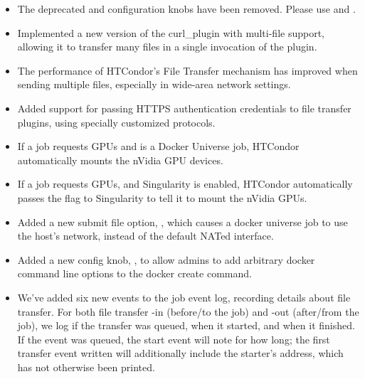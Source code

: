 \begin{itemize}

\item The deprecated  and 
configuration knobs have been removed. Please use 
and .

\item Implemented a new version of the curl\_plugin with multi-file support,
allowing it to transfer many files in a single invocation of the plugin.
 

\item The performance of HTCondor's File Transfer mechanism has improved when
	sending multiple files, especially in wide-area network settings.

\item Added support for passing HTTPS authentication credentials to
file transfer plugins, using specially customized protocols.

\item If a job requests GPUs and is a Docker Universe job, HTCondor
automatically mounts the nVidia GPU devices.

\item If a job requests GPUs, and Singularity is enabled, HTCondor
automatically passes the  flag to Singularity to tell it to mount
the nVidia GPUs.

\item Added a new submit file option, ,
which causes a docker universe job to use the host's network,
instead of the default NATed interface.

\item Added a new config knob, ,
to allow admins to add arbitrary docker command line options to
the docker create command.

\item We've added six new events to the job event log, recording details
about file transfer.  For both file transfer -in (before/to the job) and
-out (after/from the job), we log if the transfer was queued, when it started,
and when it finished.  If the event was queued, the start event will note
for how long; the first transfer event written will additionally include
the starter's address, which has not otherwise been printed.


\end{itemize}
